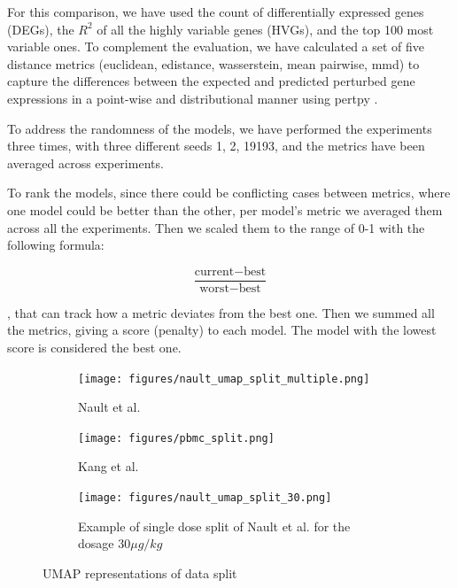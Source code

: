 \documentclass[12pt, a4paper]{article}
\begin{document}
For this comparison, we have used the count of differentially expressed genes (DEGs), the $R^2$ of all the highly variable genes (HVGs), and the top 100 most variable ones. To complement the evaluation, we have calculated a set of five distance metrics (euclidean, edistance, wasserstein, mean pairwise, mmd) to capture the differences between the expected and predicted perturbed gene expressions in a point-wise and distributional manner using pertpy \cite{heumos2024pertpy}.

To address the randomness of the models, we have performed the experiments three times, with three different seeds 1, 2, 19193, and the metrics have been averaged across experiments.

To rank the models, since there could be conflicting cases between metrics, where one model could be better than the other, per model's metric we averaged them across all the experiments. Then we scaled them to the range of 0-1 with the following formula:

\[\frac{\text{current} - \text{best}}{\text{worst} - \text{best}}\]


, that can track how a metric deviates from the best one. Then we summed all the metrics, giving a score (penalty) to each model. The model with the lowest score is considered the best one.

\begin{figure}[h!]
    \centering
    \begin{subfigure}[t]{0.48\textwidth}
        \centering
        \texttt{[image: figures/nault\_umap\_split\_multiple.png]}
        \caption{Nault et al. \cite{nault2021single,nault2022benchmarking}}
        \label{fig:nault_umap}
    \end{subfigure}
    \hfill
    \begin{subfigure}[t]{0.48\textwidth}
        \centering
        \texttt{[image: figures/pbmc\_split.png]}
        \caption{Kang et al. \cite{kanaGenerativeModelingSinglecell2023}}
        \label{fig:pbmc_umap}
    \end{subfigure}
    \begin{subfigure}[b]{0.48\textwidth}
        \centering
        \texttt{[image: figures/nault\_umap\_split\_30.png]}
        \caption{Example of single dose split of Nault et al. \cite{kanaGenerativeModelingSinglecell2023} for the dosage $30 \mu g/kg$}
        \label{fig:pbmc_umap}
    \end{subfigure}    
    \caption{UMAP representations of data split}
    \label{fig:umap_side_by_side}
\end{figure}
\end{document}
